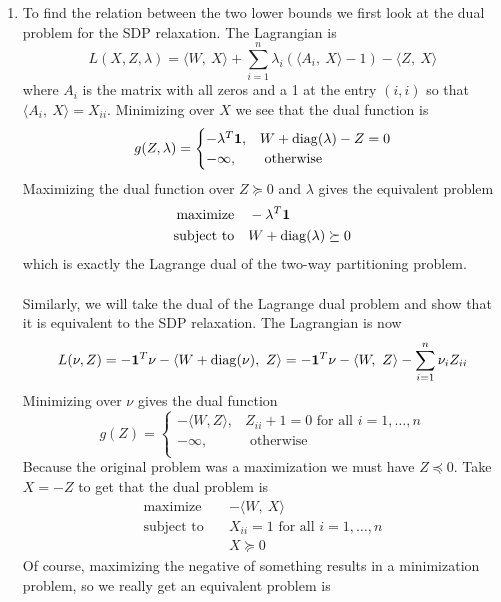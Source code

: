 \documentclass[11pt]{amsart}
\begin{document}
\begin{enumerate}
\begin{enumerate}
\item To find the relation between the two lower bounds we first look at the dual problem for the SDP relaxation.  The Lagrangian is
\[
L(X,Z,\lambda) = \langle W,\ X \rangle + \sum_{i=1}^n \lambda_i (\langle A_{i},\  X\rangle - 1) - \langle Z,\ X \rangle
\]
where $A_i$ is the matrix with all zeros and a 1 at the entry $(i,i)$ so that $\langle A_i,\ X \rangle = X_{ii}$.  Minimizing over $X$ we see that the dual function is
\[
g(Z,\lambda) = \begin{cases}
-\lambda^T {\bf 1}, & W + \mathrm{diag}(\lambda) - Z = 0 \\
-\infty, & \text{ otherwise }
\end{cases}
\]
Maximizing the dual function over $Z \succeq 0$ and $\lambda$ gives the equivalent problem
\begin{equation*}
\begin{aligned}
\mathrm{maximize} \quad & -\lambda^T {\bf 1}  \\
\textrm{subject to}\quad & W + \mathrm{diag}(\lambda) \succeq 0 \\
\end{aligned}
\end{equation*}
which is exactly the Lagrange dual of the two-way partitioning problem.\\
\\
Similarly, we will take the dual of the Lagrange dual problem and show that it is equivalent to the SDP relaxation.  The Lagrangian is now
\[
L(\nu, Z) = -{\bf 1}^T \nu - \langle W + \mathrm{diag}(\nu),\ Z \rangle = -{\bf 1}^T \nu - \langle W,\ Z \rangle - \sum_{i=1}^n \nu_i Z_{ii}
\]
Minimizing over $\nu$ gives the dual function
\[
g(Z) = \begin{cases}
-\langle W, Z \rangle, & Z_{ii} + 1 = 0 \text{ for all } i = 1,\ldots,n\\
-\infty, & \text{ otherwise }\\
\end{cases}
\]
Because the original problem was a maximization we must have $Z \preceq 0$.  Take $X = -Z$ to get that the dual problem is
\begin{equation*}
\begin{aligned}
\mathrm{maximize} \quad & -\langle W,\ X\rangle  \\
\textrm{subject to}\quad & X_{ii} = 1 \text{ for all } i = 1,\ldots, n\\
& X \succeq 0
\end{aligned}
\end{equation*}
Of course, maximizing the negative of something results in a minimization problem, so we really get an equivalent problem is 

\end{enumerate}
\end{enumerate}
\end{document}
